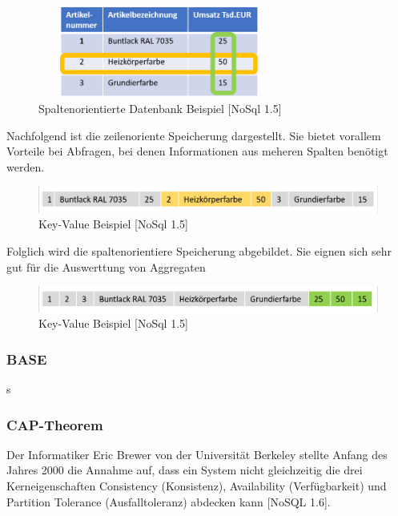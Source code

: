 \begin{figure}[h]
\centering
\includegraphics[width=8cm, height = 3cm]{images/SpaltenorientiereDatenbank.png}
\caption{Spaltenorientierte Datenbank Beispiel [NoSql 1.5]}
\end{figure}

Nachfolgend ist die zeilenoriente Speicherung dargestellt. Sie bietet vorallem Vorteile bei Abfragen, bei denen Informationen aus meheren Spalten benötigt werden.
\newline


\begin{figure}[h]
\centering
\includegraphics[width=15cm]{images/zeilenorientiert.png}
\caption{Key-Value Beispiel [NoSql 1.5]}
\end{figure}

Folglich wird die spaltenorientiere Speicherung abgebildet. Sie eignen sich sehr gut für die Auswerttung von Aggregaten
\newline


\begin{figure}[h]
\centering
\includegraphics[width=15cm]{images/spaltenorientiert.png}
\caption{Key-Value Beispiel [NoSql 1.5]}
\end{figure}

\subsubsection{BASE}
s
\newline

\subsubsection{CAP-Theorem}
Der Informatiker Eric Brewer von der Universität Berkeley stellte Anfang des Jahres 2000 die Annahme auf, dass ein System nicht gleichzeitig die drei Kerneigenschaften Consistency (Konsistenz), Availability (Verfügbarkeit) und Partition Tolerance (Ausfalltoleranz) abdecken kann [NoSQL 1.6]. 
\newline

